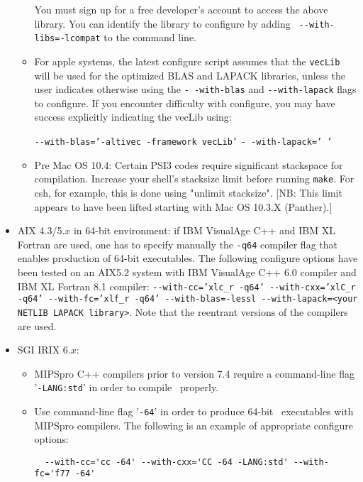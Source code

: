 \documentclass[12pt]{article}
\begin{document}
\begin{itemize}
\begin{itemize}
You must sign up for a free developer's account to access the above
library.  You can identify the library to configure by adding {\tt
  -}{\tt -with-libs=-lcompat} to the command line.

\item For apple systems, the latest configure script assumes that the
  {\tt vecLib} will be used for the optimized BLAS and LAPACK
  libraries, unless the user indicates otherwise using the {\tt -}{\tt
    -with-blas} and {\tt -}{\tt -with-lapack} flags to configure.  If
  you encounter difficulty with configure, you may have success
  explicitly indicating the vecLib using:

      {\tt -}{\tt -with-blas='-altivec -framework vecLib'} {\tt -}{\tt
        -with-lapack=' '}

    \item Pre Mac OS 10.4: Certain PSI3 codes require significant
      stackspace for compilation.  Increase your shell's stacksize
      limit before running {\tt make}.  For csh, for example, this is
      done using "unlimit stacksize".  [NB: This limit appears to have
      been lifted starting with Mac OS 10.3.X (Panther).]

  \end{itemize}

\item AIX 4.3/5.$x$ in 64-bit environment:
if IBM VisualAge C++ and IBM XL Fortran are used,
one has to specify manually
the {\tt -q64} compiler flag
that enables production of 64-bit executables.
The following configure options have been tested on an AIX5.2
system with IBM VisualAge C++ 6.0 compiler and IBM XL Fortran 8.1 compiler:
{\tt -}{\tt -with-cc='xlc\_r -q64' -}{\tt -with-cxx='xlC\_r -q64'
 -}{\tt -with-fc='xlf\_r -q64' -}{\tt -with-blas=-lessl
 -}{\tt -with-lapack=<your NETLIB LAPACK library>}. Note that
the reentrant versions of the compilers
are used.

\item SGI IRIX 6.$x$:
  \begin{itemize}
   \item MIPSpro C++ compilers prior to version 7.4 require a command-line flag
   '{\tt -LANG:std}' in order to compile \PSIthree\ properly.

   \item Use command-line flag '{\tt -64}' in order to produce 64-bit \PSIthree\ executables with
   MIPSpro compilers. The following is an example of appropriate configure options:
   \begin{verbatim}
  --with-cc='cc -64' --with-cxx='CC -64 -LANG:std' --with-fc='f77 -64'
   \end{verbatim}


\end{itemize}
\end{itemize}
\end{document}
